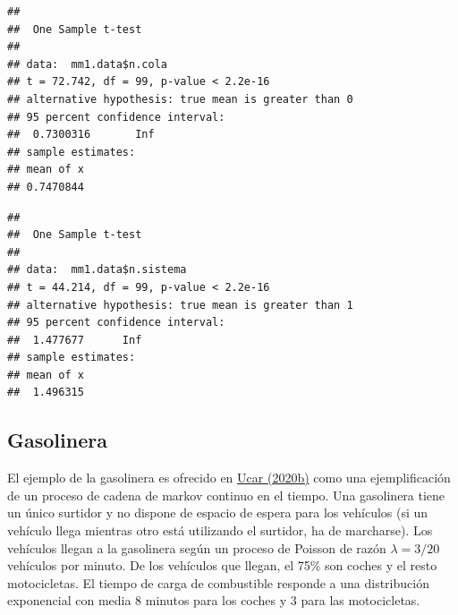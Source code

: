 \documentclass[
]{book}
\newenvironment{Shaded}{\begin{snugshade}}{\end{snugshade}}
\newcommand{\AttributeTok}[1]{\textcolor[rgb]{0.77,0.63,0.00}{#1}}
\newcommand{\DecValTok}[1]{\textcolor[rgb]{0.00,0.00,0.81}{#1}}
\newcommand{\FunctionTok}[1]{\textcolor[rgb]{0.00,0.00,0.00}{#1}}
\newcommand{\NormalTok}[1]{#1}
\newcommand{\SpecialCharTok}[1]{\textcolor[rgb]{0.00,0.00,0.00}{#1}}
\newcommand{\StringTok}[1]{\textcolor[rgb]{0.31,0.60,0.02}{#1}}
\theoremstyle{definition}
\theoremstyle{definition}
\theoremstyle{definition}
\theoremstyle{definition}
\theoremstyle{remark}
\begin{document}
\begin{Shaded}
\end{Shaded}

\begin{verbatim}
## 
##  One Sample t-test
## 
## data:  mm1.data$n.cola
## t = 72.742, df = 99, p-value < 2.2e-16
## alternative hypothesis: true mean is greater than 0
## 95 percent confidence interval:
##  0.7300316       Inf
## sample estimates:
## mean of x 
## 0.7470844
\end{verbatim}

\begin{Shaded}
\end{Shaded}

\begin{verbatim}
## 
##  One Sample t-test
## 
## data:  mm1.data$n.sistema
## t = 44.214, df = 99, p-value < 2.2e-16
## alternative hypothesis: true mean is greater than 1
## 95 percent confidence interval:
##  1.477677      Inf
## sample estimates:
## mean of x 
##  1.496315
\end{verbatim}

\hypertarget{gasolinera}{%
\subsection{Gasolinera}\label{gasolinera}}

El ejemplo de la gasolinera es ofrecido en \href{https://r-simmer.org/articles/simmer-07-ctmc.html}{Ucar (2020b)} como una ejemplificación de un proceso de cadena de markov continuo en el tiempo.
Una gasolinera tiene un único surtidor y no dispone de espacio de espera para los vehículos (si un vehículo llega mientras otro está utilizando el surtidor, ha de marcharse). Los vehículos llegan a la gasolinera según un proceso de Poisson de razón \(\lambda=3/20\) vehículos por minuto. De los vehículos que llegan, el 75\% son coches y el resto motocicletas. El tiempo de carga de combustible responde a una distribución exponencial con media 8 minutos para los coches y 3 para las motocicletas.
\end{document}

